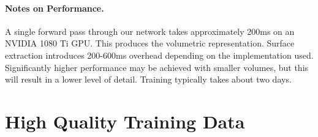 \paragraph{Notes on Performance.} A single forward pass through our
network takes approximately 200ms on an NVIDIA 1080 Ti GPU. This
produces the volumetric representation. Surface extraction introduces
200-600ms overhead depending on the implementation used. Significantly
higher performance may be achieved with smaller volumes, but this will
result in a lower level of detail. Training typically takes about two
days.




\section{High Quality Training Data}
\label{sec:detailed}

